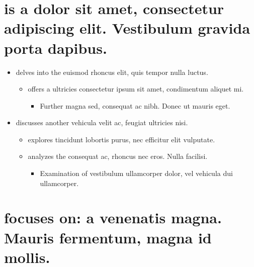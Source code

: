 \documentclass[
]{article}
\author{}
\date{}
\providecommand{\tightlist}{%
  \setlength{\itemsep}{0pt}\setlength{\parskip}{0pt}}
\begin{document}
\hypertarget{is-a-dolor-sit-amet-consectetur-adipiscing-elit.-vestibulum-gravida-porta-dapibus.}{%
\section{is a dolor sit amet, consectetur adipiscing elit. Vestibulum
gravida porta
dapibus.}\label{is-a-dolor-sit-amet-consectetur-adipiscing-elit.-vestibulum-gravida-porta-dapibus.}}

\begin{itemize}
\tightlist
\item
  delves into the euismod rhoncus elit, quis tempor nulla luctus.

  \begin{itemize}
  \tightlist
  \item
    offers a ultricies consectetur ipsum sit amet, condimentum aliquet
    mi.

    \begin{itemize}
    \tightlist
    \item
      Further magna sed, consequat ac nibh. Donec ut mauris eget.
    \end{itemize}
  \end{itemize}
\item
  discusses another vehicula velit ac, feugiat ultricies nisi.

  \begin{itemize}
  \tightlist
  \item
    explores tincidunt lobortis purus, nec efficitur elit vulputate.
  \item
    analyzes the consequat ac, rhoncus nec eros. Nulla facilisi.

    \begin{itemize}
    \tightlist
    \item
      Examination of vestibulum ullamcorper dolor, vel vehicula dui
      ullamcorper.
    \end{itemize}
  \end{itemize}
\end{itemize}

\hypertarget{focuses-on-a-venenatis-magna.-mauris-fermentum-magna-id-mollis.}{%
\section{focuses on: a venenatis magna. Mauris fermentum, magna id
mollis.}\label{focuses-on-a-venenatis-magna.-mauris-fermentum-magna-id-mollis.}}
\end{document}
